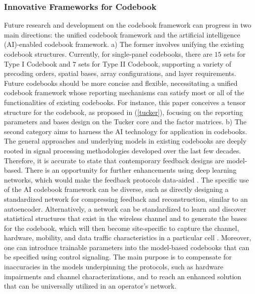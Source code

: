 \documentclass[lettersize,journal]{IEEEtran}
\begin{document}
\subsubsection{Innovative Frameworks for Codebook}
Future research and development on the codebook framework can progress in two main directions: the unified codebook framework and the artificial intelligence (AI)-enabled codebook framework. a) The former involves unifying the existing codebook structures. Currently, for single-panel codebooks, there are $15$ sets for Type I Codebook and $7$ sets for Type II Codebook, supporting a variety of precoding orders, spatial bases, array configurations, and layer requirements. Future codebooks should be more concise and flexible, necessitating a unified codebook framework whose reporting mechanisms can satisfy most or all of the functionalities of existing codebooks. For instance, this paper conceives a tensor structure for the codebook, as proposed in (\ref{tucker}), focusing on the reporting parameters and bases design on the Tucker core and the factor matrices. b) The second category aims to harness the AI technology for application in codebooks. The general approaches and underlying models in existing codebooks are deeply rooted in signal processing methodologies developed over the last few decades. Therefore, it is accurate to state that contemporary feedback designs are model-based. There is an opportunity for further enhancements using deep learning networks, which would make the feedback protocols data-aided \cite{deep1,deep2,deep3, dreifuerst2024ml, heathbeam}. The specific use of the AI codebook framework can be diverse, such as directly designing a standardized network for compressing feedback and reconstruction, similar to an autoencoder. Alternatively, a network can be standardized to learn and discover statistical structures that exist in the wireless channel and to generate the bases for the codebook, which will then become site-specific to capture the channel, hardware, mobility, and data traffic characteristics in a particular cell \cite{Heng2024a,Kwak2024a}.
Moreover, one can introduce trainable parameters into the model-based codebooks that can be specified using control signaling. The main purpose is to compensate for inaccuracies in the models underpinning the protocols, such as hardware impairments and channel characterizations, and to reach an enhanced solution that can be universally utilized in an operator's network.
\end{document}
